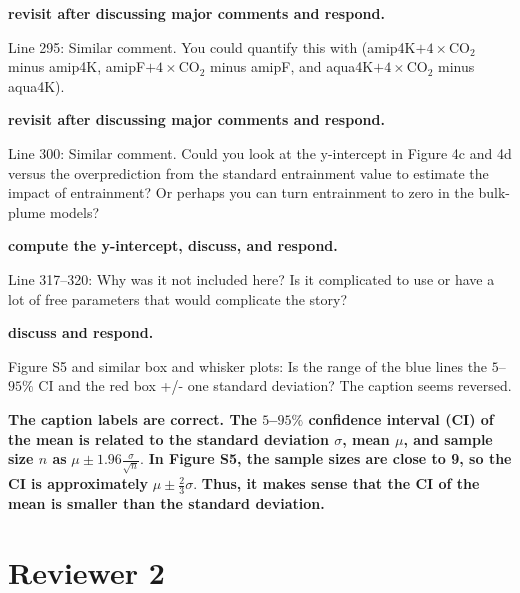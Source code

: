 \documentclass[11pt]{article}
\begin{document}
\textbf{revisit after discussing major comments and respond.}

Line 295: Similar comment. You could quantify this with (amip4K\(+4\times\)CO\(_2\) minus amip4K, amipF\(+4\times\)CO\(_2\) minus amipF, and aqua4K\(+4\times\)CO\(_2\) minus aqua4K).

\textbf{revisit after discussing major comments and respond.}

Line 300: Similar comment. Could you look at the y-intercept in Figure 4c and 4d versus the overprediction from the standard entrainment value to estimate the impact of entrainment? Or perhaps you can turn entrainment to zero in the bulk-plume models?

\textbf{compute the y-intercept, discuss, and respond.}

Line 317--320: Why was it not included here? Is it complicated to use or have a lot of free parameters that would complicate the story?

\textbf{discuss and respond.}

Figure S5 and similar box and whisker plots: Is the range of the blue lines the \(5\)--\(95\%\) CI and the red box +/- one standard deviation? The caption seems reversed.

\textbf{The caption labels are correct. The \(5\)--\(95\%\) confidence interval (CI) of the mean is related to the standard deviation \(\sigma\), mean \(\mu\), and sample size \(n\) as} \(\mu\pm1.96\frac{\sigma}{\sqrt{n}}\). \textbf{In Figure S5, the sample sizes are close to 9, so the CI is approximately} \(\mu\pm\frac{2}{3}\sigma\). \textbf{Thus, it makes sense that the CI of the mean is smaller than the standard deviation.}

\section*{Reviewer 2}
\label{sec:orgf0edd62}



\end{document}
